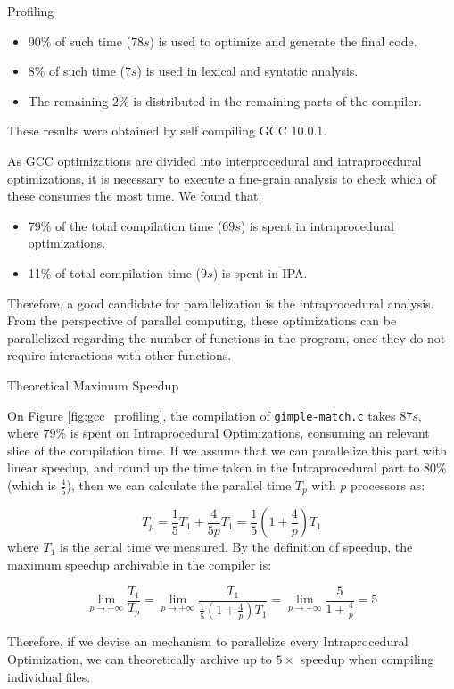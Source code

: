 \begin{section}{Profiling}
\begin{itemize}
    \item 90\% of such time ($78s$) is used to optimize and generate the final code.

    \item 8\% of such time ($7s$) is used in lexical and syntatic analysis.

    \item The remaining 2\% is distributed in the remaining parts of the compiler.
\end{itemize}

These results were obtained by self compiling GCC 10.0.1.

As GCC optimizations are divided into interprocedural and intraprocedural
optimizations, it is necessary to execute a fine-grain analysis to check which
of these consumes the most time. We found that:
\begin{itemize}
	\item 79\% of the total compilation time ($69s$) is spent in intraprocedural
	optimizations.

	\item 11\% of total compilation time ($9s$) is spent in IPA.
\end{itemize}

Therefore, a good candidate for parallelization is the intraprocedural
analysis. From the perspective of parallel computing, these optimizations can
be parallelized regarding the number of functions in the program, once they do
not require interactions with other functions.

\begin{subsection}{Theoretical Maximum Speedup}\label{sec:speedup}

On Figure \ref{fig:gcc_profiling}, the compilation of \texttt{gimple-match.c}
takes $87s$, where $79\%$ is spent on Intraprocedural Optimizations, consuming
an relevant slice of the compilation time. If we assume that we can parallelize
this part with linear speedup, and round up the time taken in the
Intraprocedural part to $80\%$ (which is $\frac{4}{5}$), then we can calculate
the parallel time $T_p$ with $p$ processors as:

$$ T_p = \frac{1}{5} T_1 + \frac{4}{5p}T_1 = \frac{1}{5} \left( 1 + \frac{4}{p}
\right)T_1 $$
where $T_1$ is the serial time we measured. By the definition of speedup,
the maximum speedup archivable in the compiler is:

\begin{equation}
\lim_{p \rightarrow +\infty} \frac{T_1}{T_p} = \lim_{p \rightarrow +\infty}
\frac{T_1}{\frac{1}{5} \left( 1 + \frac{4}{p} \right)T_1} = \lim_{p \rightarrow
+\infty} \frac{5}{1 + \frac{4}{p}} = 5
\label{eq:speedup}
\end{equation}

Therefore, if we devise an mechanism to parallelize every Intraprocedural
Optimization, we can theoretically archive up to $5\times$ speedup when compiling individual
files.

\end{subsection}

\end{section}


